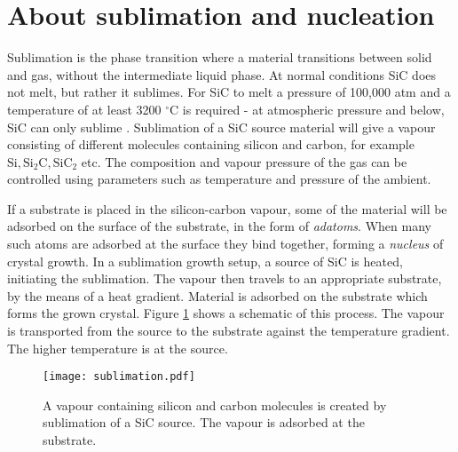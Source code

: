  \section{About sublimation and nucleation}
 \label{sec:growth:sub_nuc}
 Sublimation is the phase transition where a material transitions between solid and gas, without the intermediate liquid phase. At normal conditions SiC does not melt, but rather it sublimes. For SiC to melt a pressure of 100,000 atm and a temperature of at least 3200 $^\circ$C is required - at atmospheric pressure and below, SiC can only sublime \cite{Scheel2003}. Sublimation of a SiC source material will give a vapour consisting of different molecules containing silicon and carbon, for example $\mathrm{Si, Si_2C, SiC_2}$ etc. The composition and vapour pressure of the gas can be controlled using parameters such as temperature and pressure of the ambient. 
 
If a substrate is placed in the silicon-carbon vapour, some of the material will be adsorbed on the surface of the substrate, in the form of \emph{adatoms}. When many such atoms are adsorbed at the surface they bind together, forming a \emph{nucleus} of crystal growth. In a sublimation growth setup, a source of SiC is heated, initiating the sublimation. The vapour then travels to an appropriate substrate, by the means of a heat gradient. Material is adsorbed on the substrate which forms the grown crystal. Figure \ref{fig:sublimation} shows a schematic of this process. The vapour is transported from the source to the substrate against the temperature gradient. The higher temperature is at the source. 

\begin{figure}[h]
\begin{center}
\texttt{[image: sublimation.pdf]}
\caption{A vapour containing silicon and carbon molecules is created by sublimation of a SiC source. The vapour is adsorbed at the substrate. 
\label{fig:sublimation}}
\end{center}
\end{figure}
 
